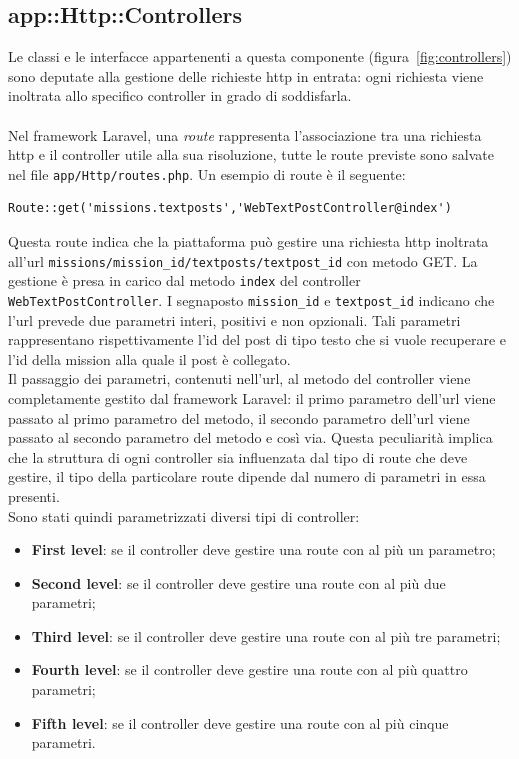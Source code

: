 \subsection{app::Http::Controllers} %

Le classi e le interfacce appartenenti a questa componente (figura~\ref{fig:controllers}) sono deputate alla gestione delle richieste \gls{http}\glsfirstoccur{} in entrata: ogni richiesta viene inoltrata allo specifico controller in grado di soddisfarla. 
\\ \\
Nel framework Laravel, una \textit{route} rappresenta l'associazione tra una richiesta \gls{http}\glsfirstoccur{} e il controller utile alla sua risoluzione, tutte le route previste sono salvate nel file \verb!app/Http/routes.php!. 
Un esempio di route è il seguente:

\begin{lstlisting}[frame=none]
Route::get('missions.textposts','WebTextPostController@index')
\end{lstlisting}

Questa route indica che la piattaforma può gestire una richiesta \gls{http}\glsfirstoccur{} inoltrata all'\gls{url}\glsfirstoccur{} \verb!missions/mission_id/textposts/textpost_id! con metodo GET. La gestione è presa in carico dal metodo \verb!index! del controller \verb!WebTextPostController!. I segnaposto \verb!mission_id! e \verb!textpost_id! indicano che l'\gls{url}\glsfirstoccur{} prevede due parametri interi, positivi e non opzionali. Tali parametri rappresentano rispettivamente l'id del post di tipo testo che si vuole recuperare e l'id della mission alla quale il post è collegato. \\
Il passaggio dei parametri, contenuti nell'\gls{url}\glsfirstoccur{}, al metodo del controller viene completamente gestito dal framework Laravel: il primo parametro dell'\gls{url}\glsfirstoccur{} viene passato al primo parametro del metodo, il secondo parametro dell'\gls{url}\glsfirstoccur{} viene passato al secondo parametro del metodo e così via. 
Questa peculiarità implica che la struttura di ogni controller sia influenzata dal tipo di route che deve gestire, il tipo della particolare route dipende dal numero di parametri in essa presenti.\\ 
Sono stati quindi parametrizzati diversi tipi di controller:

\begin{itemize}
	\item \textbf{First level}: se il controller deve gestire una route con al più un parametro;
	\item \textbf{Second level}: se il controller deve gestire una route con al più due parametri;
	\item \textbf{Third level}: se il controller deve gestire una route con al più tre parametri;
	\item \textbf{Fourth level}: se il controller deve gestire una route con al più quattro parametri;
	\item \textbf{Fifth level}: se il controller deve gestire una route con al più cinque parametri.
\end{itemize}

